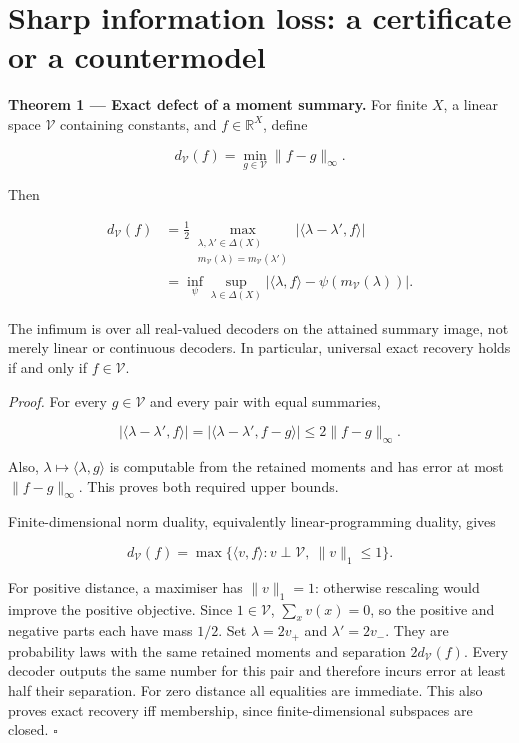 \documentclass[11pt,a4paper]{article}
\begin{document}
\section{Sharp information loss: a certificate or a
countermodel}\label{sharp-information-loss-a-certificate-or-a-countermodel}


\textbf{Theorem 1 --- Exact defect of a moment summary.} For finite
\(X\), a linear space \(\mathscr V\) containing constants, and
\(f\in\mathbb R^X\), define

\nopagebreak[4]

\[
d_{\mathscr V}(f)=\min_{g\in\mathscr V}\|f-g\|_\infty.
\]

Then

\nopagebreak[4]

\[
\begin{aligned}
d_{\mathscr V}(f)
&=\frac12\max_{\substack{\lambda,\lambda'\in\Delta(X)\\
                    m_{\mathscr V}(\lambda)=m_{\mathscr V}(\lambda')}}
       |\langle\lambda-\lambda',f\rangle|\\
&=\inf_{\psi}\sup_{\lambda\in\Delta(X)}
       |\langle\lambda,f\rangle-\psi(m_{\mathscr V}(\lambda))|.
\end{aligned}
\]

The infimum is over all real-valued decoders on the attained summary
image, not merely linear or continuous decoders. In particular,
universal exact recovery holds if and only if \(f\in\mathscr V\).

\emph{Proof.} For every \(g\in\mathscr V\) and every pair with equal
summaries,

\nopagebreak[4]

\[
|\langle\lambda-\lambda',f\rangle|
=|\langle\lambda-\lambda',f-g\rangle|
\le2\|f-g\|_\infty.
\]

Also, \(\lambda\mapsto\langle\lambda,g\rangle\) is computable from the
retained moments and has error at most \(\|f-g\|_\infty\). This proves
both required upper bounds.

Finite-dimensional norm duality, equivalently linear-programming
duality, gives

\nopagebreak[4]

\[
d_{\mathscr V}(f)=
\max\{\langle v,f\rangle:v\perp\mathscr V,\ \|v\|_1\le1\}.
\]

For positive distance, a maximiser has \(\|v\|_1=1\): otherwise
rescaling would improve the positive objective. Since
\(1\in\mathscr V\), \(\sum_xv(x)=0\), so the positive and negative parts
each have mass \(1/2\). Set \(\lambda=2v_+\) and \(\lambda'=2v_-\). They
are probability laws with the same retained moments and separation
\(2d_{\mathscr V}(f)\). Every decoder outputs the same number for this
pair and therefore incurs error at least half their separation. For zero
distance all equalities are immediate. This also proves exact recovery
iff membership, since finite-dimensional subspaces are closed.
\(\square\)
\end{document}
